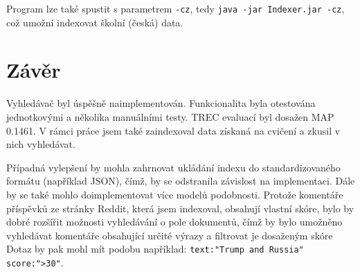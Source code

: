 \documentclass[11pt,a4paper]{scrartcl}
\begin{document}
	Program lze také spustit s parametrem \verb|-cz|, tedy \verb|java -jar Indexer.jar -cz|, což umožní indexovat školní (česká) data.
	
	\section{Závěr}
	
	Vyhledávač byl úspěšně naimplementován. Funkcionalita byla otestována jednotkovými a několika manuálními testy. TREC evaluací byl dosažen MAP 0.1461. V rámci práce jsem také zaindexoval data získaná na cvičení a zkusil v nich vyhledávat.
	
	Případná vylepšení by mohla zahrnovat ukládání indexu do standardizovaného formátu (například JSON), čímž, by se odstranila závislost na implementaci. Dále by se také mohlo doimplementovat více modelů podobnosti. Protože komentáře příspěvků ze stránky Reddit, která jsem indexoval, obsahují vlastní skóre, bylo by dobré rozšířit možnosti vyhledávání o pole dokumentů, čímž by bylo umožněno vyhledávat komentáře obsahující určité výrazy a filtrovat je dosaženým skóre Dotaz by pak mohl mít podobu například: \verb|text:"Trump and Russia" score:">30"|.
	
\end{document}
